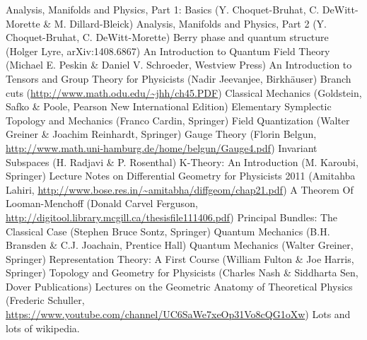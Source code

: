 \documentclass[12pt]{report}
\begin{document}
\begin{thebibliography}{99}
	Analysis, Manifolds and Physics, Part 1: Basics (Y. Choquet-Bruhat, C. DeWitt-Morette \& M. Dillard-Bleick)
	Analysis, Manifolds and Physics, Part 2 (Y. Choquet-Bruhat, C. DeWitt-Morette)
	Berry phase and quantum structure (Holger Lyre, arXiv:1408.6867)
	An Introduction to Quantum Field Theory (Michael E. Peskin \& Daniel V. Schroeder, Westview Press)
    	An Introduction to Tensors and Group Theory for Physicists (Nadir Jeevanjee, Birkh\"auser)
    	Branch cuts (\url{http://www.math.odu.edu/~jhh/ch45.PDF})
	Classical Mechanics (Goldstein, Safko \& Poole, Pearson New International Edition)
	Elementary Symplectic Topology and Mechanics (Franco Cardin, Springer)
	Field Quantization (Walter Greiner \& Joachim Reinhardt, Springer)
	Gauge Theory (Florin Belgun, \url{http://www.math.uni-hamburg.de/home/belgun/Gauge4.pdf})
	Invariant Subspaces (H. Radjavi \& P. Rosenthal)
	K-Theory: An Introduction (M. Karoubi, Springer)
	Lecture Notes on Differential Geometry for Physicists 2011 (Amitahba Lahiri, \url{http://www.bose.res.in/~amitabha/diffgeom/chap21.pdf})
	A Theorem Of Looman-Menchoff (Donald Carvel Ferguson, \url{http://digitool.library.mcgill.ca/thesisfile111406.pdf})
	Principal Bundles: The Classical Case (Stephen Bruce Sontz, Springer)
    	Quantum Mechanics (B.H. Bransden \& C.J. Joachain, Prentice Hall)
    	Quantum Mechanics (Walter Greiner, Springer)
	Representation Theory: A First Course (William Fulton \& Joe Harris, Springer)
	Topology and Geometry for Physicists (Charles Nash \& Siddharta Sen, Dover Publications)
	Lectures on the Geometric Anatomy of Theoretical Physics (Frederic Schuller, \url{https://www.youtube.com/channel/UC6SaWe7xeOp31Vo8cQG1oXw})
	Lots and lots of wikipedia.
\end{thebibliography}
\printindex
\end{document}
